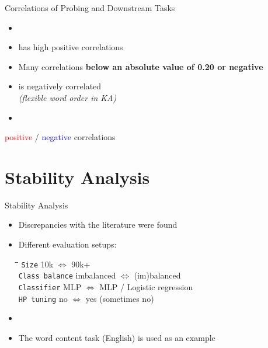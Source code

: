 \documentclass[accentcolor=tud1a,colorbacktitle,inverttitle,landscape,german,presentation,t]{tudbeamer}
\begin{document}
\begin{frame}{Correlations of Probing and Downstream Tasks}{}
\begin{minipage}{0.69\textwidth}
\begin{itemize}
			\item[] 
			\item {} has high positive correlations
			\item Many correlations \textbf{below an absolute value of 0.20 or negative}
			\item {} is negatively correlated \\ \textit{(flexible word order in KA)}
			\item {}
		\end{itemize}
		\vfill
		{\footnotesize \textcolor{red}{positive} / \textcolor{blue}{negative} correlations}
	\end{minipage}
\end{frame}


\section{Stability Analysis}

\begin{frame}{Stability Analysis}{}
	\vspace*{-4mm}
	\begin{itemize}\setlength\itemsep{1em}
		\item Discrepancies with the literature were found
		\item Different evaluation setups: \\ \vspace*{2mm}
		\begin{tabbing}
			\hspace*{3cm}\=\hspace*{2.5cm}\=\hspace*{2cm}\=\kill
			\texttt{Size}			\>	10k	  		\>	$\Leftrightarrow$ 	\>	90k+					\\[2mm]
			\texttt{Class balance}		\>	imbalanced	\>	$\Leftrightarrow$ 	\>	(im)balanced			\\[2mm]
			\texttt{Classifier}		\>	MLP 			\>	$\Leftrightarrow$ 	\>	MLP / Logistic regression	\\[2mm]
			\texttt{HP tuning}		\>	no 			\>	$\Leftrightarrow$ 	\>	yes (sometimes no)
		\end{tabbing}
		\item {}
		\item The word content task (English) is used as an example
	\end{itemize}
\end{frame}
\end{document}
